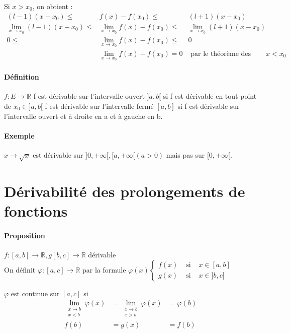 	Si $x > x_0$, on obtient : \[ \begin{array}{rcl}
			(l-1)(x-x_0) \leq & f(x) - f(x_0) \leq & (l+1)(x-x_0) \\
			\lim_{x \to x_0} (l-1)(x-x_0) \leq & \lim_{x \to x_0}f(x) - f(x_0) \leq & \lim_{x \to x_0}(l+1)(x-x_0) \\
			0 \leq & \lim_{x \to x_0}f(x) - f(x_0) \leq & 0 \\
			  & \lim_{x \to x_0}f(x) - f(x_0) = 0 & \text{ par le théorème des gendarmes, et de même pour } x < x_0 \end{array} \]


\paragraph{Définition} $f:E \rightarrow \mathbb{R}$ 
f est dérivable sur l'intervalle ouvert $]a, b[$ si f est dérivable en tout point de $x_0 \in ]a, b[$
f est dérivable sur l'intervalle fermé $[a, b]$ si f est dérivable sur l'intervalle ouvert et à droite en a et à gauche en b.

\paragraph{Exemple} $x \to \sqrt{x}$ est dérivable sur $]0, +\infty[, [a, +\infty[ (a > 0)$ mais pas sur $[0, +\infty[$.

\section{Dérivabilité des prolongements de fonctions}
\paragraph{Proposition} $f:[a, b] \rightarrow \mathbb{R}, g [b, c] \rightarrow \mathbb{R}$ dérivable ~\\
On définit $\varphi : [a, c] \rightarrow \mathbb{R}$ par la formule $\varphi(x) \left\{ \begin{array}{rcl}
		f(x) & \text{ si } & x \in [a, b] \\
		g(x) & \text{ si } & x \in ]b, c] 
	\end{array}
	\right.$

	$\varphi $ est continue sur $[a, c]$ si \[\begin{array}{rcl} 
		\lim_{\substack{x \to b \\ x < b}}\varphi (x) &= \lim_{\substack{x \to b \\ x > b}}\varphi (x) &= \varphi(b) \\
		f(b) &= g(x) & = f(b) 
	\end{array}\]

